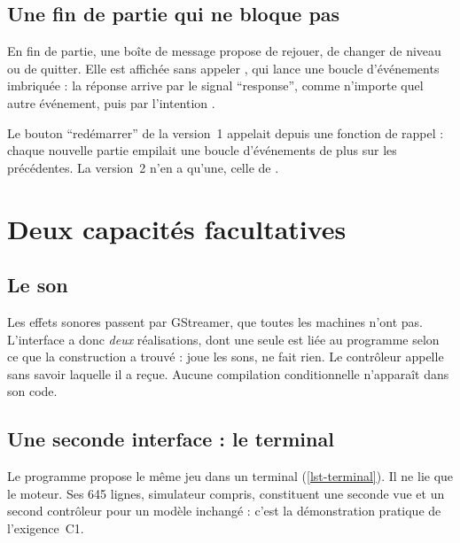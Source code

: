 \subsection{Une fin de partie qui ne bloque pas}

En fin de partie, une boîte de message propose de rejouer, de changer de niveau ou de
quitter. Elle est affichée sans appeler , qui lance une boucle
d'événements imbriquée : la réponse arrive par le signal \enquote{response}, comme n'importe
quel autre événement, puis par l'intention .

\begin{attention}
Le bouton \enquote{redémarrer} de la version~1 appelait  depuis une
fonction de rappel : chaque nouvelle partie empilait une boucle d'événements de plus sur
les précédentes. La version~2 n'en a qu'une, celle de .
\end{attention}

\section{Deux capacités facultatives}

\subsection{Le son}

Les effets sonores passent par GStreamer, que toutes les machines n'ont pas. L'interface
 a donc \emph{deux} réalisations, dont une seule est liée au programme
selon ce que la construction a trouvé :  joue les sons,
 ne fait rien. Le contrôleur appelle  sans
savoir laquelle il a reçue. Aucune compilation conditionnelle n'apparaît dans son code.

\subsection{Une seconde interface : le terminal}

Le programme  propose le même jeu dans un terminal
(\cref{lst-terminal}). Il ne lie que le moteur. Ses \num{645} lignes, simulateur compris,
constituent une seconde vue et un second contrôleur pour un modèle inchangé : c'est la
démonstration pratique de l'exigence~C1.

